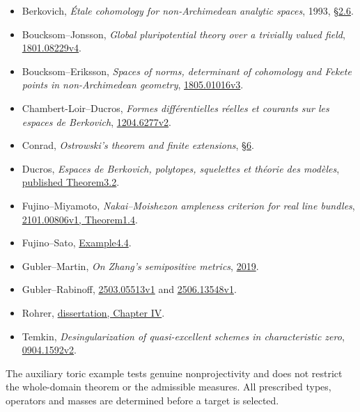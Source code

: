 \documentclass[
  10pt,
]{article}
\providecommand{\tightlist}{%
  \setlength{\itemsep}{0pt}\setlength{\parskip}{0pt}}
\begin{document}
\begin{itemize}
\tightlist
\item
  Berkovich, \emph{Étale cohomology for non-Archimedean analytic
  spaces}, 1993,
  \href{https://www.numdam.org/item/10.1007/BF02712916.pdf}{§2.6}.
\item
  Boucksom--Jonsson, \emph{Global pluripotential theory over a trivially
  valued field},
  \href{https://arxiv.org/pdf/1801.08229v4}{1801.08229v4}.
\item
  Boucksom--Eriksson, \emph{Spaces of norms, determinant of cohomology
  and Fekete points in non-Archimedean geometry},
  \href{https://arxiv.org/pdf/1805.01016v3}{1805.01016v3}.
\item
  Chambert-Loir--Ducros, \emph{Formes différentielles réelles et
  courants sur les espaces de Berkovich},
  \href{https://arxiv.org/pdf/1204.6277v2}{1204.6277v2}.
\item
  Conrad, \emph{Ostrowski's theorem and finite extensions},
  \href{https://math.stanford.edu/~conrad/676Page/handouts/ostrowski.pdf}{§6}.
\item
  Ducros, \emph{Espaces de Berkovich, polytopes, squelettes et théorie
  des modèles},
  \href{https://www.numdam.org/item/10.1142/S1793744212500077.pdf}{published
  Theorem3.2}.
\item
  Fujino--Miyamoto, \emph{Nakai--Moishezon ampleness criterion for real
  line bundles}, \href{https://arxiv.org/pdf/2101.00806v1}{2101.00806v1,
  Theorem1.4}.
\item
  Fujino--Sato,
  \href{https://www.math.kyoto-u.ac.jp/~fujino/wSato.pdf}{Example4.4}.
\item
  Gubler--Martin, \emph{On Zhang's semipositive metrics},
  \href{https://ems.press/content/serial-article-files/26466}{2019}.
\item
  Gubler--Rabinoff,
  \href{https://arxiv.org/pdf/2503.05513v1}{2503.05513v1} and
  \href{https://arxiv.org/pdf/2506.13548v1}{2506.13548v1}.
\item
  Rohrer,
  \href{https://fredrohrer.ch/wp-content/uploads/2020/06/diss.pdf}{dissertation,
  Chapter IV}.
\item
  Temkin, \emph{Desingularization of quasi-excellent schemes in
  characteristic zero},
  \href{https://arxiv.org/pdf/0904.1592v2}{0904.1592v2}.
\end{itemize}

The auxiliary toric example tests genuine nonprojectivity and does not
restrict the whole-domain theorem or the admissible measures. All
prescribed types, operators and masses are determined before a target is
selected.
\end{document}
